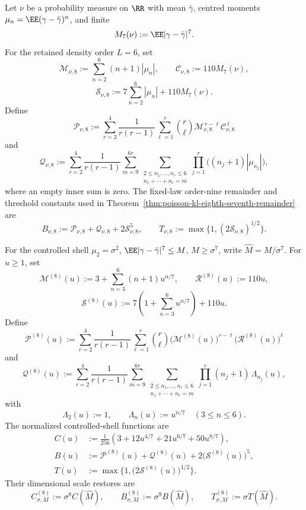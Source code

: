 \begin{definition}[\(N=4,\eta=1\) retained-order constants]
\label{def:n4-finite-time-constant-dictionary}
Let \(\nu\) be a probability measure on \(\RR\) with mean \(\bar{\gamma}\),
centred moments \(\mu_n=\EE(\gamma-\bar{\gamma})^n\), and finite
\[
M_7(\nu):=\EE|\gamma-\bar{\gamma}|^7 .
\]
For the retained density order \(L=6\), set
\[
\mathcal M_{\nu,8}:=\sum_{n=2}^{6}(n+1)|\mu_n|,
\qquad
\mathcal C_{\nu,8}:=110M_7(\nu),
\]
\[
\mathcal S_{\nu,8}:=7\sum_{n=2}^{6}|\mu_n|+110M_7(\nu).
\]
Define
\[
\mathcal P_{\nu,8}:=
\sum_{r=2}^{4}\frac{1}{r(r-1)}
\sum_{\ell=1}^{r}\binom r\ell
\mathcal M_{\nu,8}^{\,r-\ell}\mathcal C_{\nu,8}^{\,\ell}
\]
and
\[
\mathcal Q_{\nu,8}:=
\sum_{r=2}^{4}\frac{1}{r(r-1)}
\sum_{m=9}^{6r}
\sum_{\substack{2\le n_1,\ldots,n_r\le6\\
n_1+\cdots+n_r=m}}
\prod_{j=1}^{r}\bigl((n_j+1)|\mu_{n_j}|\bigr),
\]
where an empty inner sum is zero.  The fixed-law order-nine remainder and
threshold constants used in
Theorem~\ref{thm:poisson-kl-eighth-seventh-remainder} are
\begin{equation}\label{eq:dictionary-fixed-law-n4-constants}
B_{\nu,8}:=\mathcal P_{\nu,8}+\mathcal Q_{\nu,8}
+2\mathcal S_{\nu,8}^{5},
\qquad
T_{\nu,8}:=\max\{1,(2\mathcal S_{\nu,8})^{1/2}\}.
\end{equation}

For the controlled shell \(\mu_2=\sigma^2\),
\(\EE|\gamma-\bar{\gamma}|^7\le M\), \(M\ge\sigma^7\), write
\(\widehat M=M/\sigma^7\).  For \(u\ge1\), set
\[
\mathcal M^{(8)}(u)
:=3+\sum_{n=3}^{6}(n+1)u^{n/7},
\qquad
\mathcal R^{(8)}(u):=110u,
\]
\[
\mathcal S^{(8)}(u)
:=7\left(1+\sum_{n=3}^{6}u^{n/7}\right)+110u .
\]
Define
\[
\mathcal P^{(8)}(u):=
\sum_{r=2}^{4}\frac{1}{r(r-1)}
\sum_{\ell=1}^{r}\binom r\ell
\bigl(\mathcal M^{(8)}(u)\bigr)^{r-\ell}
\bigl(\mathcal R^{(8)}(u)\bigr)^\ell
\]
and
\[
\mathcal Q^{(8)}(u):=
\sum_{r=2}^{4}\frac{1}{r(r-1)}
\sum_{m=9}^{6r}
\sum_{\substack{2\le n_1,\ldots,n_r\le6\\
n_1+\cdots+n_r=m}}
\prod_{j=1}^{r}(n_j+1)\,\Lambda_{n_j}(u),
\]
with
\[
\Lambda_2(u):=1,\qquad
\Lambda_n(u):=u^{n/7}\quad(3\le n\le6).
\]
The normalized controlled-shell functions are
\begin{equation}\label{eq:dictionary-normalized-shell-functions}
\begin{aligned}
C(u)
&:=\frac{1}{256}\left(
3+12u^{4/7}+21u^{6/7}+50u^{8/7}
\right),\\
B(u)
&:=\mathcal P^{(8)}(u)+\mathcal Q^{(8)}(u)
+2\bigl(\mathcal S^{(8)}(u)\bigr)^5,\\
T(u)
&:=\max\{1,\bigl(2\mathcal S^{(8)}(u)\bigr)^{1/2}\}.
\end{aligned}
\end{equation}
Their dimensional scale restores are
\begin{equation}\label{eq:dictionary-controlled-shell-c8}
C_{\sigma,M}^{(8)}:=\sigma^8C(\widehat M),\qquad
B_{\sigma,M}^{(8)}:=\sigma^9B(\widehat M),\qquad
T_{\sigma,M}^{(8)}:=\sigma T(\widehat M).
\end{equation}
\end{definition}

